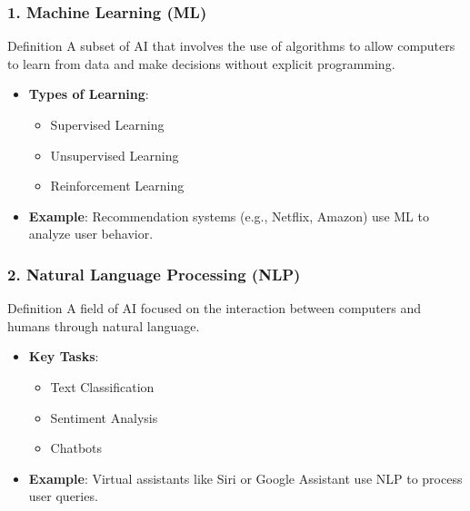 \documentclass[aspectratio=169]{beamer}
\begin{document}
\begin{frame}[fragile]
    \frametitle{1. Machine Learning (ML)}
    \begin{block}{Definition}
        A subset of AI that involves the use of algorithms to allow computers to learn from data and make decisions without explicit programming.
    \end{block}
    \begin{itemize}
        \item \textbf{Types of Learning}:
        \begin{itemize}
            \item Supervised Learning
            \item Unsupervised Learning
            \item Reinforcement Learning
        \end{itemize}
        \item \textbf{Example}: Recommendation systems (e.g., Netflix, Amazon) use ML to analyze user behavior.
    \end{itemize}
\end{frame}

\begin{frame}[fragile]
    \frametitle{2. Natural Language Processing (NLP)}
    \begin{block}{Definition}
        A field of AI focused on the interaction between computers and humans through natural language.
    \end{block}
    \begin{itemize}
        \item \textbf{Key Tasks}:
        \begin{itemize}
            \item Text Classification
            \item Sentiment Analysis
            \item Chatbots
        \end{itemize}
        \item \textbf{Example}: Virtual assistants like Siri or Google Assistant use NLP to process user queries.
    \end{itemize}
\end{frame}
\end{document}
